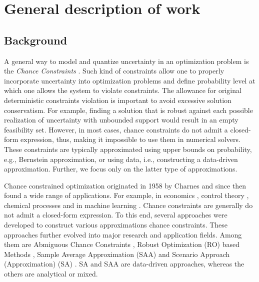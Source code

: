 \section*{General description of work} 


\subsection*{Background}



A general way to model and quantize uncertainty in an optimization problem is the \emph{Chance Constraints} \cite{geng2019data}. Such kind of constraints allow one to properly incorporate uncertainty into optimization problems and define probability level at which one allows the system to violate constraints. The allowance for original deterministic constraints violation is important to avoid excessive solution conservatism. For example, finding a solution that is robust against each possible realization of uncertainty with unbounded support would result in an empty feasibility set. However, in most cases, chance constraints do not admit a closed-form expression, thus, making it impossible to use them in numerical solvers. These constraints are typically approximated using upper bounds on probability, e.g., Bernstein approximation, \cite{nemirovski2007convex} or using data, i.e., constructing a data-driven approximation. Further, we focus only on the latter type of approximations.

Chance constrained optimization originated in 1958 by Charnes \cite{charnes1958cost} and since then found a wide range of applications. For example, in economics \cite{yaari1965uncertain}, control theory \cite{calafiore2006scenario}, chemical processes \cite{sahinidis2004optimization} and in machine learning \cite{bertsimas2018robust,caramanis2011robust}.  Chance constraints are generally do not admit a closed-form expression. To this end, several approaches were developed to construct various approximations chance constraints. These approaches further evolved into major research and application fields. Among them are Abmiguous Chance Constraints \cite{nemirovski2012safe, ben2009robust}, Robust Optimization (RO) based Methods \cite{bertsimas2011theory}, Sample Average Approximation (SAA) \cite{sen1992relaxations, ahmed2008solving} and Scenario Approach (Approximation) (SA) \cite{calafiore2005uncertain}. SA and SAA are data-driven approaches, whereas the others are analytical or mixed.


